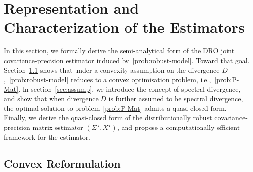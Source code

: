 \documentclass[11pt]{article}
\newcommand{\opt}{^\star}
\begin{document}
\section{Representation and Characterization of the Estimators}
\label{sec:tractable-reform}

In this section, we formally derive the semi-analytical form of the DRO joint covariance-precision estimator induced by~\eqref{prob:robust-model}. Toward that goal, Section~\ref{sec:convex-reform} shows that under a convexity assumption on the divergence $D$,~\eqref{prob:robust-model} reduces to a convex optimization problem, i.e.,~\eqref{prob:P-Mat}. In section~\ref{sec:assump}, we introduce the concept of spectral divergence, and show that when divergence $D$ is further assumed to be spectral divergence, the optimal solution to problem~\eqref{prob:P-Mat} admits a quasi-closed form. Finally, we derive the quasi-closed form of the distributionally robust covariance-precision matrix estimator $(\Sigma\opt,X\opt)$, and propose a computationally efficient framework for the estimator. 



\subsection{Convex Reformulation}\label{sec:convex-reform}
\end{document}
